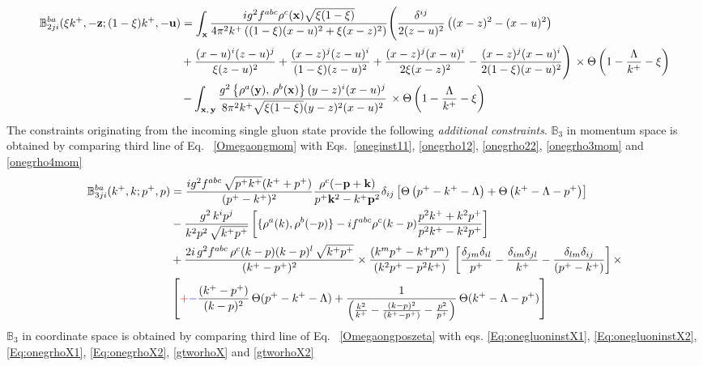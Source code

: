 \documentclass[aps,prd,amsmath,amssymb,nofootinbib]{revtex4-2}
\def\mf#1{\mathbb{#1}}
\def\v#1{\mathbf{#1}}
\numberwithin{equation}{section}
\begin{document}
\begin{align}
     \mf{B}^{ba}_{2ji}(\xi k^{+}, -\v{z}; (1-\xi)k^{+}, -\v{u}) & = \int_{\mathbf{x}}\frac{ig^{2}f^{abc}\rho^{c}(\mathbf{x})\sqrt{\xi(1-\xi)}}{4\pi^{2}k^{+}\left((1-\xi)(x-u)^{2}+\xi (x-z)^{2}\right)}\Bigg(\frac{\delta^{ij}}{2(z-u)^{2}}\left((x-z)^{2}-(x-u)^{2}\right)\notag \\ & +\frac{(x-u)^{i}(z-u)^{j}}{\xi (z-u)^{2}}+\frac{(x-z)^{j}(z-u)^{i}}{(1-\xi)(z-u)^{2}}+\frac{(x-z)^{j}(x-u)^{i}}{2\xi (x-z)^{2}} -\frac{(x-z)^{j}(x-u)^{i}}{2(1-\xi)(x-u)^{2}}\Bigg)\,\times\Theta\left(1-\frac{\Lambda}{k^{+}}-\xi\right)\notag \\ & -\int_{\mathbf{x},\,\mathbf{y}}\frac{g^{2}\left\{ \rho^{a}(\mathbf{y}),\,\rho^{b}(\mathbf{x})\right\} (y-z)^{i}(x-u)^{j}}{8\pi^{2}k^{+}\sqrt{\xi(1-\xi)}(y-z)^{2}(x-u)^{2}}\,\times\Theta\left(1-\frac{\Lambda}{k^{+}}-\xi\right)
\end{align}
The constraints originating from the incoming single gluon state provide the following {\it additional constraints}. $\mf{B}_{3}$ in momentum space is obtained by comparing third line of Eq.~ \eqref{Omegaongmom} with Eqs.~\eqref{oneginst11}, \eqref{onegrho12}, \eqref{onegrho22}, \eqref{onegrho3mom} and \eqref{onegrho4mom} 
\begin{align}
    \mf{B}^{ba}_{3ji}(k^{+},k; p^{+},p) & =  \frac{ig^2 f^{abc}\,\sqrt{p^{+}k^{+}} (k^++p^+) } {(p^+-k^+)^2} \frac{\rho^c(-\v{p}+\v{k})}{p^{+}\v{k}^2 - k^{+}\v{p}^2} \delta_{ij}\left[\Theta\left(p^{+} - k^{+} - \Lambda\right)+\Theta\left(k^{+}-\Lambda-p^{+}\right)\right]\notag \\ & -\frac{g^{2}\,k^{i}p^{j}}{k^{2}p^{2}\,\sqrt{k^{+}p^{+}}}\left[\{\rho^{a}(k),\rho^{b}(-p)\}-if^{abc}\rho^{c}(k-p)\frac{p^{2}k^{+}+k^{2}p^{+}}{p^{2}k^{+}-k^{2}p^{+}}\right]\notag \\ & +\frac{2i\,g^{2}f^{abc}\,\rho^{c}(k-p)(k-p)^{l}\,\sqrt{k^{+}p^{+}}}{(k^{+}-p^{+})^{2}}\times \frac{\left(k^{m}p^{+}-k^{+}p^{m}\right)}{\left(k^{2}p^{+}-p^{2}k^{+}\right)}\,\left[\frac{\delta_{jm}\delta_{il}}{p^{+}}-\frac{\delta_{im}\delta_{jl}}{k^{+}}-\frac{\delta_{lm}\delta_{ij}}{(p^{+}-k^{+})}\right]\times \notag \\ & \left[\textcolor{red}{+}\textcolor{blue}{-}\frac{(k^{+}-p^{+})}{(k-p)^{2}}\,\Theta(p^{+}-k^{+}-\Lambda)+\frac{1}{\left(\frac{k^{2}}{k^{+}}-\frac{(k-p)^{2}}{(k^{+}-p^{+})}-\frac{p^{2}}{p^{+}}\right)}\,\Theta(k^{+}-\Lambda-p^{+})\right]
\end{align}
$\mf{B}_{3}$ in coordinate space is obtained by comparing third line of Eq.~ \eqref{Omegaongposzeta} with eqs. \eqref{Eq:onegluoninstX1}, \eqref{Eq:onegluoninstX2}, \eqref{Eq:onegrhoX1}, \eqref{Eq:onegrhoX2}, \eqref{gtworhoX} and \eqref{gtworhoX2}
\end{document}
